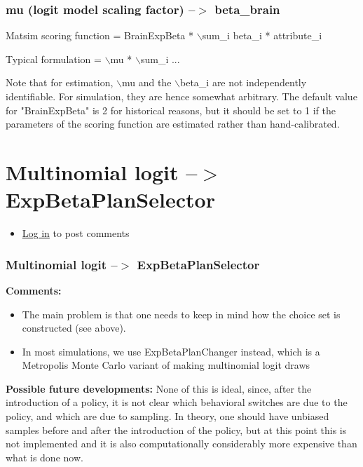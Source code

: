 \documentclass[a4paper,11pt]{report}
\begin{document}
\subsubsection{mu (logit model scaling factor) --$>$ beta\_brain}

Matsim scoring function = BrainExpBeta * $\backslash$sum\_i beta\_i * attribute\_i

Typical formulation = $\backslash$mu * $\backslash$sum\_i ...

Note that for estimation, $\backslash$mu and the $\backslash$beta\_i are not independently  identifiable. For simulation, they are hence somewhat arbitrary. The  default value for "BrainExpBeta" is 2 for historical reasons, but it  should be set to 1 if the parameters of the scoring function are  estimated rather than hand-calibrated.

\vfill\eject
\section{Multinomial logit --$>$ ExpBetaPlanSelector}
\begin{itemize}
	\item \href{http://www.matsim.org/user/login?destination=comment/reply/541%23comment-form}{Log in} to post comments
\end{itemize}

\subsubsection{Multinomial logit --$>$ ExpBetaPlanSelector}

\textbf{Comments:}
\begin{itemize}
	\item The main problem is that one needs to keep in mind how the choice set is constructed (see above).
	\item In most simulations, we use ExpBetaPlanChanger instead, which is a   Metropolis Monte Carlo variant of making multinomial logit draws
\end{itemize}

\textbf{Possible future developments:} None of this is  ideal,  since, after the introduction of a policy, it is not clear which   behavioral switches are due to the policy, and which are due to   sampling. In theory, one should have unbiased samples before and  after  the introduction of the policy, but at this point this is not   implemented and it is also computationally considerably more expensive   than what is done now.
\end{document}
